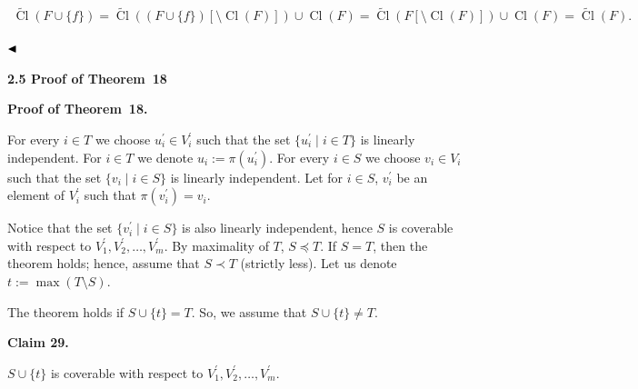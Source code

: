 \documentclass[10pt,a4paper]{article}
\begin{document}
 
\[\begin{gathered}\widetilde{\mathop{\mathrm{Cl}}}(F\cup\{f\})=\widetilde{\mathop{\mathrm{Cl}}}((F\cup\{f\})[\setminus\mathop{\mathrm{Cl}}(F)])\cup\mathop{\mathrm{Cl}}(F)=\widetilde{\mathop{\mathrm{Cl}}}(F[\setminus\mathop{\mathrm{Cl}}(F)])\cup\mathop{\mathrm{Cl}}(F)=\widetilde{\mathop{\mathrm{Cl}}}(F).\ \end{gathered}\] 
 




$\hfill\blacktriangleleft$\par


\par\medskip\noindent\textbf{
2.5 Proof of Theorem 18
}\par

\par\medskip\noindent\textbf{Proof of Theorem 18.}\par


For every $i\in T$ we choose $u_{i}^{\prime}\in V^{\prime}_{i}$ such that the set $\{u^{\prime}_{i}\mid i\in T\}$ is linearly independent. For $i\in T$ we denote $u_{i}:=\pi(u^{\prime}_{i})$. For every $i\in S$ we choose $v_{i}\in V_{i}$ such that the set
$\{v_{i}\mid i\in S\}$ is linearly independent. Let for $i\in S$, $v^{\prime}_{i}$ be an element of $V_{i}^{\prime}$ such that $\pi(v^{\prime}_{i})=v_{i}$.\par



Notice that the set $\{v^{\prime}_{i}\mid i\in S\}$ is also linearly independent, hence $S$ is coverable with respect to $V^{\prime}_{1},V^{\prime}_{2},\dots,V^{\prime}_{m}$. By maximality of $T$, $S\preceq T$. If $S=T$, then the theorem holds; hence, assume that $S\prec T$ (strictly less).
Let us denote $t:=\max(T\setminus S)$.\par



The theorem holds if $S\cup\{t\}=T$. So, we assume that $S\cup\{t\}\neq T$.\par



\par\medskip\noindent\textbf{
Claim 29. 
}\par



$S\cup\{t\}$ is coverable with respect to $V^{\prime}_{1},V^{\prime}_{2},\dots,V^{\prime}_{m}$.\par
\end{document}
